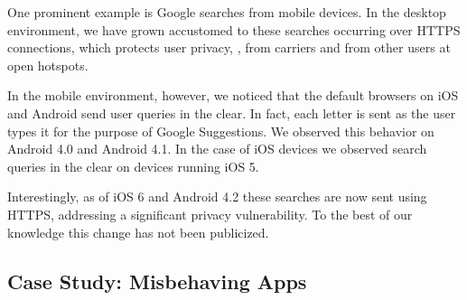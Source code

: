 One prominent example is Google searches from mobile devices. In the 
desktop environment, we have grown accustomed to these searches 
occurring over HTTPS connections, which protects user privacy, \eg, from 
carriers and from other users at open \wifi hotspots. 

In the mobile environment, however, we noticed that the default 
browsers on iOS and Android send user queries in the clear. In fact, 
each letter is sent as the user types it for the purpose of Google Suggestions. 
We
observed this behavior on Android 4.0 and Android 4.1. In the case of iOS devices we observed search queries
in the clear on devices running iOS 5. 

Interestingly, as of iOS 6 and Android 4.2 these searches are now sent using HTTPS, addressing 
a significant privacy vulnerability. To the best of our knowledge this 
change has not been publicized. 

%


\subsection{Case Study: Misbehaving Apps}
\label{sec:case-study-filtering}


